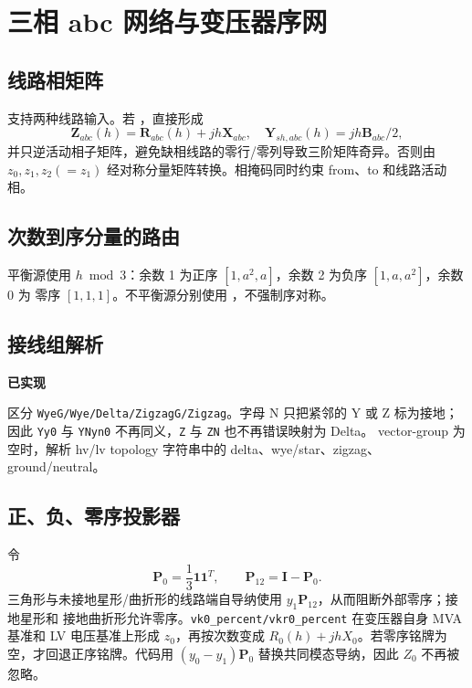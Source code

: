 \section{三相 abc 网络与变压器序网}
\subsection{线路相矩阵}
 支持两种线路输入。若
，直接形成
\begin{equation}
\mathbf Z_{abc}(h)=\mathbf R_{abc}(h)+jh\mathbf X_{abc},\quad
\mathbf Y_{sh,abc}(h)=jh\mathbf B_{abc}/2,
\end{equation}
并只逆活动相子矩阵，避免缺相线路的零行/零列导致三阶矩阵奇异。否则由
$z_0,z_1,z_2(=z_1)$ 经对称分量矩阵转换。相掩码同时约束 from、to 和线路活动相。

\subsection{次数到序分量的路由}
平衡源使用 $h\bmod3$：余数 1 为正序 $[1,a^2,a]$，余数 2 为负序 $[1,a,a^2]$，余数 0 为
零序 $[1,1,1]$。不平衡源分别使用 ，不强制序对称。

\subsection{接线组解析}
\textbf{已实现}\par\noindent
{} 区分
\texttt{WyeG/Wye/Delta/ZigzagG/Zigzag}。字母 N 只把紧邻的 Y 或 Z 标为接地；因此
\texttt{Yy0} 与 \texttt{YNyn0} 不再同义，\texttt{Z} 与 \texttt{ZN} 也不再错误映射为 Delta。
vector-group 为空时，解析 hv/lv topology 字符串中的 delta、wye/star、zigzag、ground/neutral。

\subsection{正、负、零序投影器}
令
\begin{equation}
\mathbf P_0=\frac13\mathbf 1\mathbf 1^T,\qquad
\mathbf P_{12}=\mathbf I-\mathbf P_0.
\end{equation}
三角形与未接地星形/曲折形的线路端自导纳使用 $y_1\mathbf P_{12}$，从而阻断外部零序；接地星形和
接地曲折形允许零序。\texttt{vk0\_percent/vkr0\_percent} 在变压器自身 MVA 基准和 LV 电压基准上形成
$z_0$，再按次数变成 $R_0(h)+jhX_0$。若零序铭牌为空，才回退正序铭牌。代码用
$(y_0-y_1)\mathbf P_0$ 替换共同模态导纳，因此 $Z_0$ 不再被忽略。

